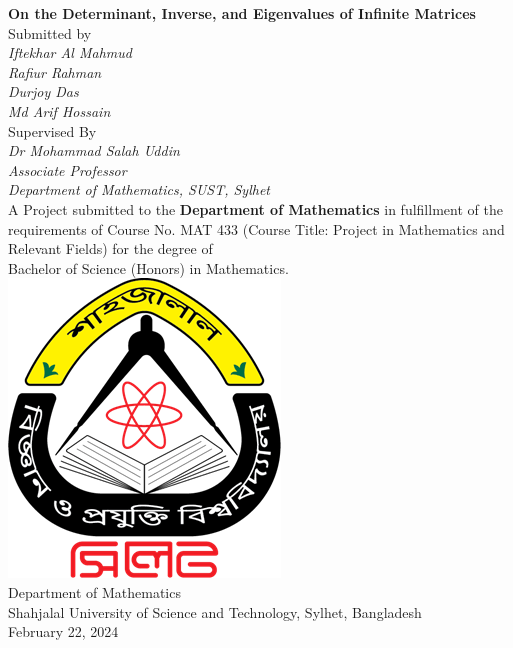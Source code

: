 \begin{titlepage}
    \centering
    \LARGE \textbf{On the Determinant, Inverse, and Eigenvalues of Infinite Matrices} \\
    \vfill
    \large Submitted by \\
    \vfill
    \Large \textit{Iftekhar Al Mahmud} \\
    \Large \textit{Rafiur Rahman} \\
    \Large \textit{Durjoy Das} \\
    \Large \textit{Md Arif Hossain} \\
    \vfill
    \large Supervised By \\
    \vfill
    \Large \textit{Dr Mohammad Salah Uddin} \\
    \vspace{0.2cm}
    \Large \textit{Associate Professor} \\
    \vspace{0.2cm}
    \large \textit{Department of Mathematics, SUST, Sylhet} \\
    \vfill
    \large A Project submitted to the \textbf{Department of Mathematics} in fulfillment of the requirements of Course No. MAT 433 (Course Title: Project in Mathematics and Relevant Fields) for the degree of \\
    \Large Bachelor of Science (Honors) in Mathematics. \\
    \vfill
    \includegraphics[scale=0.3]{Figures/SUST.png} \\
    \vspace{0.2cm}
    \large Department of Mathematics \\
    Shahjalal University of Science and Technology, Sylhet, Bangladesh \\
    February 22, 2024
\end{titlepage}


